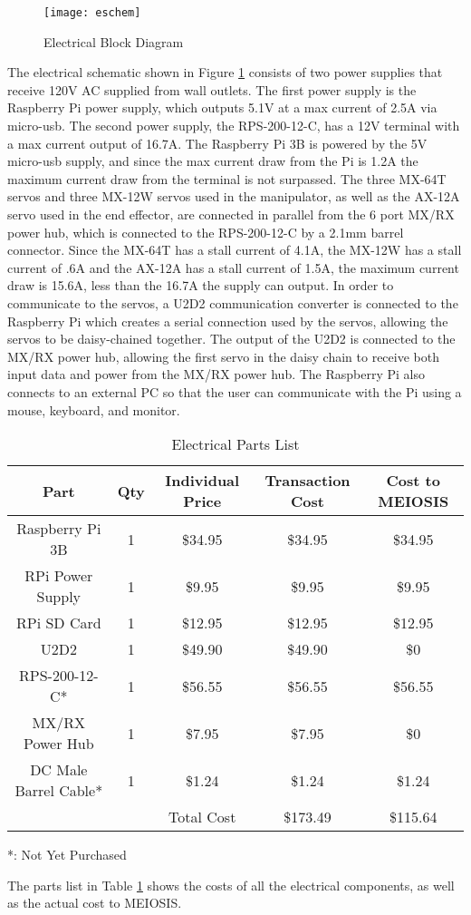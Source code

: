 \begin{figure}[htp]
  \centering
  \texttt{[image: eschem]}
  \caption{Electrical Block Diagram}
  \label{fig:ElectricalBlockDiagram}
\end{figure}
The electrical schematic shown in Figure \ref{fig:ElectricalBlockDiagram} consists of two power supplies that receive 120V AC supplied from wall outlets. The first power supply is the Raspberry Pi power supply, which outputs 5.1V at a max current of 2.5A via micro-usb. The second power supply, the RPS-200-12-C, has a 12V terminal with a max current output of 16.7A. The Raspberry Pi 3B is powered by the 5V micro-usb supply, and since the max current draw from the Pi is 1.2A the maximum current draw from the terminal is not surpassed. The three MX-64T servos and three MX-12W servos used in the manipulator, as well as the AX-12A servo used in the end effector, are connected in parallel from the 6 port MX/RX power hub, which is connected to the RPS-200-12-C by a 2.1mm barrel connector. Since the MX-64T has a stall current of 4.1A, the MX-12W has a stall current of .6A and the AX-12A has a stall current of 1.5A, the maximum current draw is 15.6A, less than the 16.7A the supply can output. In order to communicate to the servos, a U2D2 communication converter is connected to the Raspberry Pi which creates a serial connection used by the servos, allowing the servos to be daisy-chained together. The output of the U2D2 is connected to the MX/RX power hub, allowing the first servo in the daisy chain to receive both input data and power from the MX/RX power hub. The Raspberry Pi also connects to an external PC so that the user can communicate with the Pi using a mouse, keyboard, and monitor.
\newpage
\begin{table}[htp]
  \center
  \caption{ Electrical Parts List}
  \label{tab:ElectricalPartsList}
  \begin{tabular}{c|c|c|c|c}
  Part & Qty & Individual Price & Transaction Cost & Cost to MEIOSIS \\\hline
  Raspberry Pi 3B & 1 & \$34.95 & \$34.95 & \$34.95 \\
  RPi Power Supply & 1 & \$9.95 & \$9.95 & \$9.95 \\
  RPi SD Card & 1 & \$12.95 & \$12.95 & \$12.95 \\
  U2D2 & 1 & \$49.90 & \$49.90 & \$0 \\
  RPS-200-12-C* & 1 & \$56.55 & \$56.55 & \$56.55 \\
  MX/RX Power Hub & 1 & \$7.95 & \$7.95 & \$0 \\
  DC Male Barrel Cable* & 1 & \$1.24 & \$1.24 & \$1.24 \\
  & & Total Cost & \$173.49 & \$115.64 \\
  \end{tabular}
  \small{*: Not Yet Purchased}
\end{table}

The parts list in Table \ref{tab:ElectricalPartsList} shows the costs of all the electrical components, as well as the actual cost to MEIOSIS.
